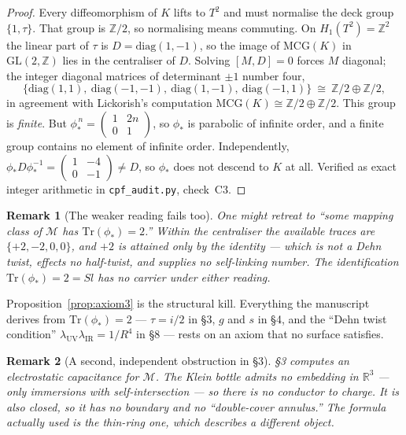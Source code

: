 \documentclass[11pt,a4paper]{article}
\newtheorem{remark}{Remark}
\newcommand{\Sl}{\mathit{Sl}}
\begin{document}
\begin{proof}
Every diffeomorphism of $K$ lifts to $T^2$ and must normalise the deck group
$\{1,\tau\}$. That group is $\mathbb{Z}/2$, so normalising means commuting. On
$H_1(T^2)=\mathbb{Z}^2$ the linear part of $\tau$ is $D=\mathrm{diag}(1,-1)$, so the
image of $\mathrm{MCG}(K)$ in $\mathrm{GL}(2,\mathbb{Z})$ lies in the centraliser of
$D$. Solving $[M,D]=0$ forces $M$ diagonal; the integer diagonal matrices of
determinant $\pm1$ number four,
\[
\{\mathrm{diag}(1,1),\ \mathrm{diag}(-1,-1),\ \mathrm{diag}(1,-1),\
\mathrm{diag}(-1,1)\}\ \cong\ \mathbb{Z}/2\oplus\mathbb{Z}/2,
\]
in agreement with Lickorish's computation $\mathrm{MCG}(K)\cong
\mathbb{Z}/2\oplus\mathbb{Z}/2$. This group is \emph{finite}. But
$\phi_*^{\,n} = \left(\begin{smallmatrix}1&2n\\0&1\end{smallmatrix}\right)$, so
$\phi_*$ is parabolic of infinite order, and a finite group contains no element of
infinite order. Independently,
$\phi_* D\phi_*^{-1} = \left(\begin{smallmatrix}1&-4\\0&-1\end{smallmatrix}\right)
\neq D$, so $\phi_*$ does not descend to $K$ at all. Verified as exact integer
arithmetic in \texttt{cpf\_audit.py}, check~C3.
\end{proof}

\begin{remark}[The weaker reading fails too]
One might retreat to ``some mapping class of $\mathcal{M}$ has
$\mathrm{Tr}(\phi_*)=2$.'' Within the centraliser the available traces are
$\{+2,-2,0,0\}$, and $+2$ is attained \emph{only by the identity} --- which is not a
Dehn twist, effects no half-twist, and supplies no self-linking number. The
identification $\mathrm{Tr}(\phi_*) = 2 = \Sl$ has no carrier under either reading.
\end{remark}

Proposition~\ref{prop:axiom3} is the structural kill. Everything the manuscript
derives from $\mathrm{Tr}(\phi_*)=2$ --- $\tau=i/2$ in \S3, $g$ and $s$ in \S4, and
the ``Dehn twist condition'' $\lambda_{\mathrm{UV}}\lambda_{\mathrm{IR}}=1/R^4$ in
\S8 --- rests on an axiom that no surface satisfies.

\begin{remark}[A second, independent obstruction in \S3]
\S3 computes an electrostatic capacitance for $\mathcal{M}$. The Klein bottle admits
no embedding in $\mathbb{R}^3$ --- only immersions with self-intersection --- so
there is no conductor to charge. It is also closed, so it has no boundary and no
``double-cover annulus.'' The formula actually used is the thin-ring one, which
describes a different object.
\end{remark}
\end{document}

